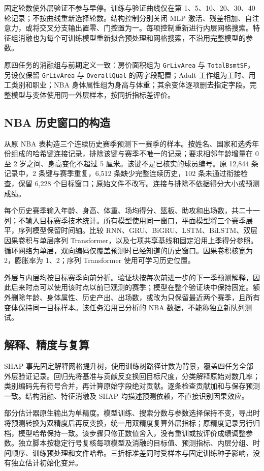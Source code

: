 \documentclass[12pt,journal,onecolumn,a4paper]{IEEEtran}
\newcommand{\code}[1]{\nolinkurl{#1}}
\begin{document}
固定轮数使外层验证不参与早停。训练与验证曲线仅在第 1、5、10、20、30、40 轮记录；不按曲线重新选择轮数。结构控制分别关闭 MLP 激活、残差相加、自注意力，或将交叉分支输出置零、门控置为一。每项控制重新进行内层网格搜索。特征组消融也为每个可训练模型重新拟合预处理和网格搜索，不沿用完整模型的参数。

原四任务的消融组与前期定义一致：房价面积组为 \code{GrLivArea} 与 \code{TotalBsmtSF}，另设仅保留 \code{GrLivArea} 与 \code{OverallQual} 的两字段配置；Adult 工作组为工时、用工类别和职业；NBA 身体属性组为身高与体重；其余变体逐项删去指定字段。完整模型与变体使用同一外层样本，按同折指标差评价。

\subsection{NBA 历史窗口的构造}
从原 NBA 表构造三个连续历史赛季预测下一赛季的样本。按姓名、国家和选秀年份组成的哈希键连接记录，排除该键与赛季不唯一的记录；要求相邻年龄增量在 0 至 2 岁之间、身高变化不超过 5 厘米。该键不是已核实的球员编号。原 12,844 条记录中，2 条键与赛季重复，6,512 条缺少完整连续历史，102 条未通过衔接检查，保留 6,228 个目标窗口；原始文件不改写。连接与排除不依据得分大小或预测成绩。

每个历史赛季输入年龄、身高、体重、场均得分、篮板、助攻和出场数，共二十一列；不输入目标赛季技术统计。所有模型使用同一窗口，平面模型将三个赛季展平，序列模型保留时间轴。比较 RNN、GRU、BiGRU、LSTM、BiLSTM、双层因果卷积与单层序列 Transformer\citep{torchlstm,tcn2018,transformer2017}，以及七项共享基线和固定沿用上季得分参照。循环网络为单层，双向编码仅覆盖预测时已经知道的历史窗口。因果卷积核宽为 2，膨胀率为 1、2；序列 Transformer 使用可学习历史位置。

外层与内层均按目标赛季向前分折。验证块按每次前进一步的下一季预测解释，因此后来时点可以使用该时点以前已观测的赛季；模型在整个验证块中保持固定。额外删除年龄、身体属性、历史产出、出场数，或改为只保留最近两个赛季，且所有变体保持同一目标样本。该任务沿用已分析的 NBA 数据，不能称独立新队列测试。

\subsection{解释、精度与复算}
SHAP 事先固定解释网格提升树，使用训练树路径计数为背景，覆盖四任务全部外层验证记录。回归先将基准与贡献反变换回目标尺度，分类解释原始对数几率；类别编码先有符号合并，再计算原始字段绝对贡献。逐条检查贡献加和与保存预测一致。结构消融、特征消融及 SHAP 均描述预测依赖，不直接识别因果效应。

部分估计器原生输出为单精度。模型训练、搜索分数与参数选择保持不变，导出时将预测转换为双精度后再反变换，统一用双精度复算外层指标；原精度记录另行归档，模型哈希保持一致。该步骤只修正数值舍入，没有重训或按评价成绩调整参数。独立脚本按稳定行号复核每项模型及消融的目标值、预测指标、内层分组、时间顺序、训练预处理和文件哈希。三折标准差同时受样本与固定训练种子影响，没有独立估计初始化变异。
\end{document}
